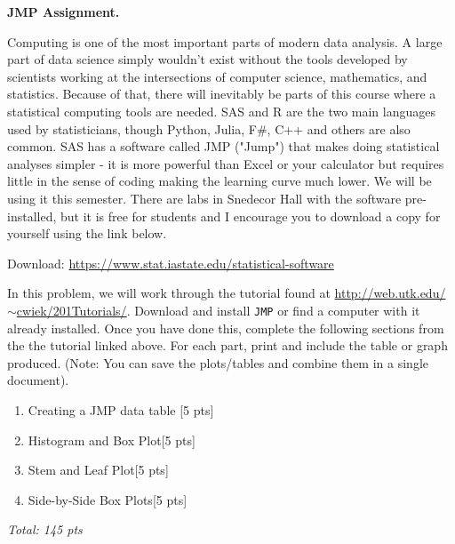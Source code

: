 \documentclass[11pt]{article}\usepackage[]{graphicx}\usepackage[]{color}
\begin{document}

\item \textbf{JMP Assignment.} 

   Computing is one of the most important parts of modern data analysis. A large part of data science simply wouldn't exist without the tools developed by scientists working at the intersections of computer science, mathematics, and statistics. 
   Because of that, there will inevitably be parts of this course where a statistical computing tools are needed. SAS and R are the two main languages used by statisticians, though Python, Julia, F\#, C++ and others are also common.
   SAS has a software called JMP ("Jump") that makes doing statistical analyses simpler - it is more powerful than Excel or your calculator but requires little in the sense of coding making the learning curve much lower. 
   We will be using it this semester. There are labs in Snedecor Hall with the software pre-installed, but it is free for students and I encourage you to download a copy for yourself using the link below.

   Download: \href{https://www.stat.iastate.edu/statistical-software}{https://www.stat.iastate.edu/statistical-software}

   In this problem, we will work through the tutorial found at \href{http://web.utk.edu/~cwiek/201Tutorials/}{http://web.utk.edu/$\sim$cwiek/201Tutorials/}. Download and install \texttt{JMP} or find a computer with it already installed. Once you have done this, complete the following sections from the the tutorial linked above. For each part, print and include the table or graph produced. (Note: You can save the plots/tables and combine them in a single document).

   \begin{enumerate}
      \item Creating a JMP data table [5 pts]
      \item Histogram and Box Plot[5 pts]
      \item Stem and Leaf Plot[5 pts]
      \item Side-by-Side Box Plots[5 pts]
   \end{enumerate}



\emph{Total: 145 pts}
\end{document}
